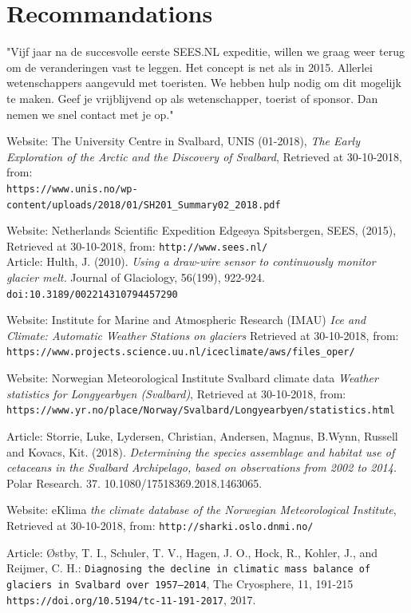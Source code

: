 \documentclass[11pt]{report}
\begin{document}
\chapter{Recommandations}\label{sec:rec}
"Vijf jaar na de succesvolle eerste SEES.NL expeditie, willen we graag weer terug om de veranderingen vast te leggen. Het concept is net als in 2015. Allerlei wetenschappers aangevuld met toeristen. We hebben hulp nodig om dit mogelijk te maken. Geef je vrijblijvend op als wetenschapper, toerist of sponsor. Dan nemen we snel contact met je op."
\medskip

\begin{thebibliography}{9}
Website: The University Centre in Svalbard, UNIS (01-2018), 
\textit{The Early Exploration of the Arctic and the Discovery of
Svalbard},
Retrieved at 30-10-2018, from:\\
\texttt{\small{https://www.unis.no/wp-content/uploads/2018/01/SH201\_Summary02\_2018.pdf}}

Website: Netherlands Scientific Expedition Edgeøya Spitsbergen, SEES, (2015), \\ Retrieved at 30-10-2018, from:
\texttt{\small{http://www.sees.nl/}}\\

Article: Hulth, J. (2010). 
\textit{Using a draw-wire sensor to continuously monitor glacier melt.} Journal of Glaciology, 56(199), 922-924. 
\texttt{doi:10.3189/002214310794457290}

Website: Institute for Marine and Atmospheric Research (IMAU)
\textit{Ice and Climate: Automatic Weather Stations on glaciers}
Retrieved at 30-10-2018, from:
\texttt{https://www.projects.science.uu.nl/iceclimate/aws/files\_oper/}

Website: Norwegian Meteorological Institute Svalbard climate data
\textit{Weather statistics for Longyearbyen (Svalbard)},
Retrieved at 30-10-2018, from:
\texttt{https://www.yr.no/place/Norway/Svalbard/Longyearbyen/statistics.html}


Article: Storrie, Luke, Lydersen, Christian, Andersen, Magnus, B.Wynn, Russell and Kovacs, Kit. (2018). 
\textit{Determining the species assemblage and habitat use of cetaceans in the Svalbard Archipelago, based on observations from 2002 to 2014.} Polar Research. 37. 10.1080/17518369.2018.1463065. 

Website: eKlima \textit{the climate database of the Norwegian Meteorological Institute}, Retrieved at 30-10-2018, from:
\texttt{http://sharki.oslo.dnmi.no/}

Article: Østby, T. I., Schuler, T. V., Hagen, J. O., Hock, R., Kohler, J., and Reijmer, C. H.: \texttt{Diagnosing the decline in climatic mass balance of glaciers in Svalbard over 1957–2014}, 
The Cryosphere, 11, 191-215 \texttt{https://doi.org/10.5194/tc-11-191-2017}, 2017.

\end{thebibliography}
\end{document}
